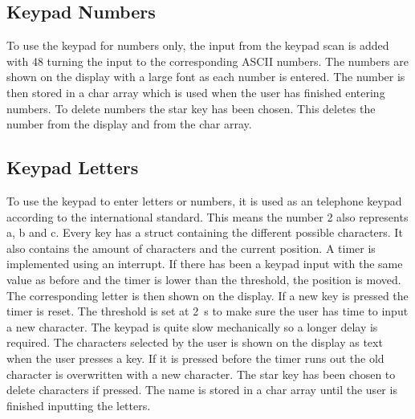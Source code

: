 \subsection{Keypad Numbers}
To use the keypad for numbers only, the input from the keypad scan is added with 48 turning the input to the corresponding ASCII numbers. The numbers are shown on the display with a large font as each number is entered. The number is then stored in a char array which is used when the user has finished entering numbers. To delete numbers the star key has been chosen. This deletes the number from the display and from the char array.

\subsection{Keypad Letters}
To use the keypad to enter letters or numbers, it is used as an telephone keypad according to the international standard. \cite{keypad} This means the number 2 also represents a, b and c. Every key has a struct containing the different possible characters. It also contains the amount of characters and the current position. 
A timer is implemented using an interrupt. If there has been a keypad input with the same value as before and the timer is lower than the threshold, the position is moved. The corresponding letter is then shown on the display. If a new key is pressed the timer is reset. The threshold is set at \SI{2}{\second} to make sure the user has time to input a new character. The keypad is quite slow mechanically so a longer delay is required. The characters selected by the user is shown on the display as text when the user presses a key. If it is pressed before the timer runs out the old character is overwritten with a new character. The star key has been chosen to delete characters if pressed. The name is stored in a char array until the user is finished inputting the letters.
